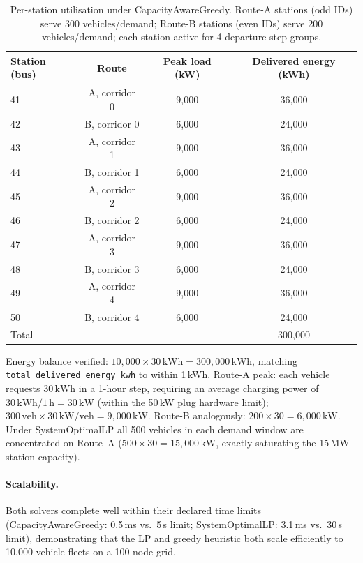 \begin{table}[htbp]
\centering
\caption{Per-station utilisation under CapacityAwareGreedy.
  Route-A stations (odd IDs) serve 300 vehicles/demand;
  Route-B stations (even IDs) serve 200 vehicles/demand;
  each station active for 4 departure-step groups.}
\label{tab:nr-station-util}
\begin{tabular}{lccc}
\toprule
Station (bus) & Route & Peak load (kW) & Delivered energy (kWh) \\
\midrule
41 & A, corridor 0 & 9{,}000 & 36{,}000 \\
42 & B, corridor 0 & 6{,}000 & 24{,}000 \\
43 & A, corridor 1 & 9{,}000 & 36{,}000 \\
44 & B, corridor 1 & 6{,}000 & 24{,}000 \\
45 & A, corridor 2 & 9{,}000 & 36{,}000 \\
46 & B, corridor 2 & 6{,}000 & 24{,}000 \\
47 & A, corridor 3 & 9{,}000 & 36{,}000 \\
48 & B, corridor 3 & 6{,}000 & 24{,}000 \\
49 & A, corridor 4 & 9{,}000 & 36{,}000 \\
50 & B, corridor 4 & 6{,}000 & 24{,}000 \\
\midrule
Total & & --- & 300{,}000 \\
\bottomrule
\end{tabular}
\end{table}

Energy balance verified: $10{,}000 \times 30\,\text{kWh} = 300{,}000\,\text{kWh}$,
matching \texttt{total\_delivered\_energy\_kwh} to within 1\,kWh.
Route-A peak: each vehicle requests $30\,\text{kWh}$ in a 1-hour step,
requiring an average charging power of $30\,\text{kWh}/1\,\text{h} = 30\,\text{kW}$
(within the 50\,kW plug hardware limit);
$300\,\text{veh} \times 30\,\text{kW/veh} = 9{,}000\,\text{kW}$.
Route-B analogously: $200 \times 30 = 6{,}000\,\text{kW}$.
Under SystemOptimalLP all 500 vehicles in each demand window are concentrated
on Route~A ($500 \times 30 = 15{,}000\,\text{kW}$, exactly saturating the
15\,MW station capacity).

\paragraph{Scalability.}
Both solvers complete well within their declared time limits
(CapacityAwareGreedy: 0.5\,ms vs.\ 5\,s limit;
SystemOptimalLP: 3.1\,ms vs.\ 30\,s limit), demonstrating that
the LP and greedy heuristic both scale efficiently to 10,000-vehicle
fleets on a 100-node grid.

